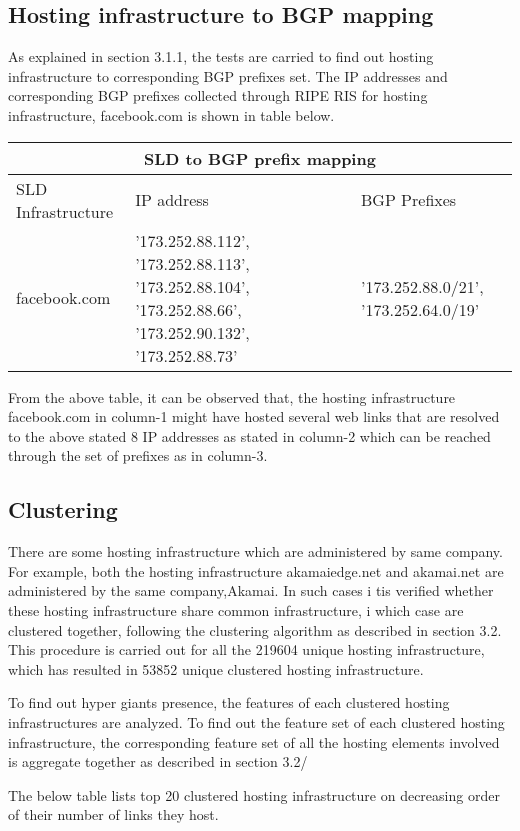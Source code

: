 \subsection{Hosting infrastructure to BGP mapping}
As explained in section 3.1.1, the tests are carried to find out hosting infrastructure to corresponding BGP prefixes set. The IP addresses and corresponding BGP prefixes collected through RIPE RIS for hosting infrastructure, facebook.com is shown in table below.

\begin{tabular}{|p{3cm}||p{3cm}|p{3cm}| }
 \hline
 \multicolumn{3}{|c|}{SLD to BGP prefix mapping} \\
 \hline
 SLD Infrastructure     & IP address&BGP Prefixes\\
 \hline
 facebook.com   & '173.252.88.112', '173.252.88.113', '173.252.88.104', '173.252.88.66', '173.252.90.132', '173.252.88.73'    &'173.252.88.0/21', '173.252.64.0/19'\\
\hline
\end{tabular}
\newline

From the above table, it can be observed that, the hosting infrastructure facebook.com in column-1 might have hosted several web links that are resolved to the above stated 8 IP addresses as stated in column-2 which can be reached through the set of prefixes as in column-3.

\subsection{Clustering}
There are some hosting infrastructure which are administered by same company. For example, both the hosting infrastructure akamaiedge.net and akamai.net are administered by the same company,Akamai. In such cases i tis verified whether these hosting infrastructure share common infrastructure, i which case are clustered together, following the clustering algorithm as described in section 3.2. This procedure is carried out for all the 219604 unique hosting infrastructure, which has resulted in 53852 unique clustered hosting infrastructure.

To find out hyper giants presence, the features of each clustered hosting infrastructures are analyzed. To find out the feature set of each clustered hosting infrastructure, the corresponding feature set of all the hosting elements involved is aggregate together as described in section 3.2/ 

The below table lists top 20 clustered hosting infrastructure on decreasing order of their number of links they host.

